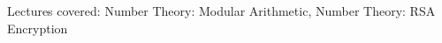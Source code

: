 \documentclass[handout]{mcs}
\begin{document}
\renewcommand{\reading}{
  Chapter~\bref{number_theory_chap}.\ ~\bref{modular_arithmeric_sec}.\ \emph{Modular Arithmetic}\ through~\bref{RSA_sec}.\ \emph{RSA Encryption}
  }


\begin{staffnotes}
Lectures covered: Number Theory: Modular Arithmetic, Number Theory: RSA Encryption
\end{staffnotes}





















\end{document}
